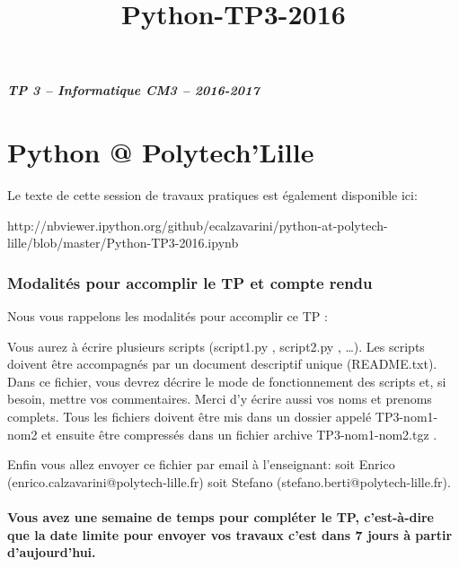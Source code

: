 \documentclass{article}
\title{Python-TP3-2016}
\begin{document}
    
    \date{} 
    \maketitle
    
    

    
    \subparagraph{TP 3 -- Informatique CM3 --
2016-2017}\label{tp-3-informatique-cm3-2016-2017}

    \section{Python @ Polytech'Lille}\label{python-polytechlille}

    Le texte de cette session de travaux pratiques est également disponible
ici:

http://nbviewer.ipython.org/github/ecalzavarini/python-at-polytech-lille/blob/master/Python-TP3-2016.ipynb

    \subsubsection{Modalités pour accomplir le TP et compte
rendu}\label{modalituxe9s-pour-accomplir-le-tp-et-compte-rendu}

    Nous vous rappelons les modalités pour accomplir ce TP :

Vous aurez à écrire plusieurs scripts (script1.py , script2.py ,
\ldots{}). Les scripts doivent être accompagnés par un document
descriptif unique (README.txt). Dans ce fichier, vous devrez décrire le
mode de fonctionnement des scripts et, si besoin, mettre vos
commentaires. Merci d'y écrire aussi vos noms et prenoms complets. Tous
les fichiers doivent être mis dans un dossier appelé TP3-nom1-nom2 et
ensuite être compressés dans un fichier archive TP3-nom1-nom2.tgz .

Enfin vous allez envoyer ce fichier par email à l'enseignant: soit
Enrico (enrico.calzavarini@polytech-lille.fr) soit Stefano
(stefano.berti@polytech-lille.fr).

    \paragraph{Vous avez une semaine de temps pour compléter le TP,
c'est-à-dire que la date limite pour envoyer vos travaux c'est dans 7
jours à partir
d'aujourd'hui.}\label{vous-avez-une-semaine-de-temps-pour-compluxe9ter-le-tp-cest-uxe0-dire-que-la-date-limite-pour-envoyer-vos-travaux-cest-dans-7-jours-uxe0-partir-daujourdhui.}
\end{document}
